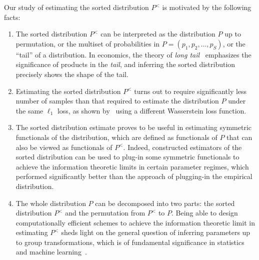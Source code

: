 \documentclass[final,12pt]{colt2018} %
\begin{document}
Our study of estimating the sorted distribution $P^{<}$ is motivated by the following facts:
\begin{enumerate}
	\item The sorted distribution $P^{<}$ can be interpreted as the distribution $P$ up to permutation, or the multiset of probabilities in $P = (p_1,p_2,\ldots,p_S)$, or the ``tail'' of a distribution. In economics, the theory of \emph{long tail}~\cite{anderson2004long} emphasizes the significance of products in the \emph{tail}, and inferring the sorted distribution precisely shows the shape of the tail.
	\item Estimating the sorted distribution $P^{<}$ turns out to require significantly less number of samples than that required to estimate the distribution $P$ under the same $\ell_1$ loss, as shown by~\cite{Valiant--Valiant2011} using a different Wasserstein loss function. 
	\item The sorted distribution estimate proves to be useful in estimating symmetric functionals of the distribution, which are defined as functionals of $P$ that can also be viewed as functionals of $P^{<}$. Indeed, \cite{Valiant--Valiant2011,Valiant--Valiant2013estimating, acharya2016unified} constructed estimators of the sorted distribution can be used to plug-in some symmetric functionals to achieve the information theoretic limits in certain parameter regimes, which performed significantly better than the approach of plugging-in the empirical distribution.
	\item The whole distribution $P$ can be decomposed into two parts: the sorted distribution $P^{<}$ and the permutation from $P^{<}$ to $P$. Being able to design computationally efficient schemes to achieve the information theoretic limit in estimating $P^{<}$ sheds light on the general question of inferring parameters up to group transformations, which is of fundamental significance in statistics and machine learning~\cite{kong2017spectrum,tian2017learning}. 
\end{enumerate}
\end{document}
